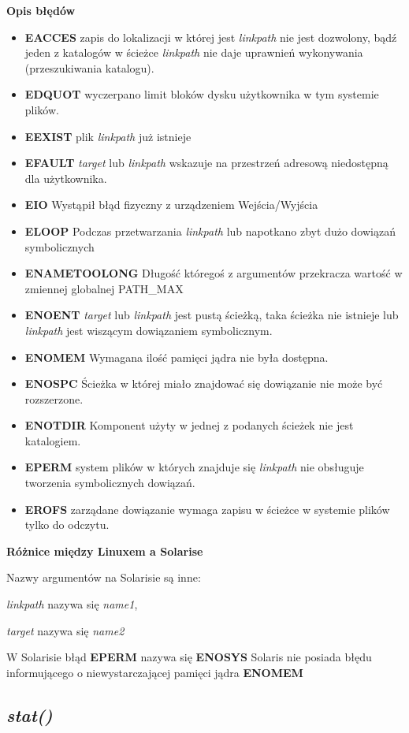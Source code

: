 \documentclass{article}
\begin{document}
\textbf{Opis błędów}
\begin{itemize}
\item \textbf{EACCES} zapis do lokalizacji w której jest \textit{linkpath} nie jest dozwolony, bądź jeden z katalogów w ścieżce \textit{linkpath} nie daje uprawnień wykonywania (przeszukiwania katalogu).
\item \textbf{EDQUOT} wyczerpano limit bloków dysku użytkownika w tym systemie plików.
\item \textbf{EEXIST} plik \textit{linkpath} już istnieje
\item \textbf{EFAULT} \textit{target} lub  \textit{linkpath} wskazuje na przestrzeń adresową niedostępną dla użytkownika.
\item \textbf{EIO} Wystąpił błąd fizyczny z urządzeniem Wejścia/Wyjścia
\item \textbf{ELOOP} Podczas przetwarzania \textit{linkpath} lub napotkano zbyt dużo dowiązań symbolicznych
\item \textbf{ENAMETOOLONG} Długość któregoś z argumentów 
przekracza wartość w zmiennej globalnej PATH\_MAX
\item \textbf{ENOENT}  \textit{target} lub \textit{linkpath} jest pustą ścieżką, taka ścieżka nie istnieje lub \textit{linkpath} jest wiszącym dowiązaniem symbolicznym. 

\item \textbf{ENOMEM}  Wymagana ilość pamięci jądra nie była dostępna.
\item \textbf{ENOSPC}  Ścieżka w której miało znajdować się dowiązanie nie może być rozszerzone.
\item \textbf{ENOTDIR}  Komponent użyty w jednej z podanych ścieżek nie jest katalogiem.
\item \textbf{EPERM} system plików w których znajduje się \textit{linkpath} nie obsługuje tworzenia symbolicznych dowiązań.
\item \textbf{EROFS} zarządane dowiązanie wymaga zapisu w ścieżce w systemie plików tylko do odczytu.



\end{itemize}
\textbf{Różnice między Linuxem a Solarise}


Nazwy argumentów na Solarisie są inne:

\textit{linkpath} nazywa się \textit{name1},

\textit{target} nazywa się \textit{name2}

W Solarisie  błąd \textbf{EPERM} nazywa się \textbf{ENOSYS}
Solaris nie posiada błędu informującego o niewystarczającej pamięci jądra \textbf{ENOMEM}


\subsection{\textit{stat()}}
\end{document}

